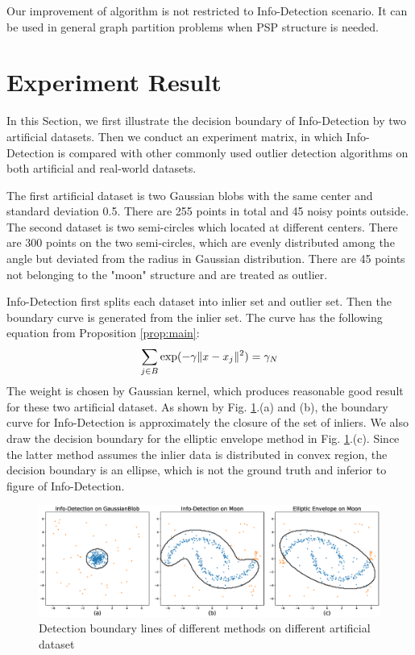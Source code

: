 \documentclass[runningheads]{llncs}
\begin{document}
Our improvement of algorithm is not restricted to Info-Detection scenario. It can be used in general graph partition problems when PSP structure is needed.

\section{Experiment Result}\label{sec:Experiemt}
In this Section, we first illustrate the decision boundary of Info-Detection by two artificial datasets. Then we conduct an experiment matrix, in which Info-Detection is compared with other commonly used outlier detection algorithms on both artificial and real-world datasets.

The first artificial dataset is two Gaussian blobs with the same center and standard deviation 0.5. There are 255 points in total and 45 noisy points outside.
The second dataset is two semi-circles which located at different centers. There are 300 points on the two semi-circles, which are evenly distributed among the angle but deviated from the radius in Gaussian distribution. There are 45 points not belonging to the "moon" structure and are treated as outlier.

Info-Detection first splits each dataset into inlier set and outlier set. Then the boundary curve is generated from the inlier set. The curve has the following equation from Proposition \ref{prop:main}:
\begin{equation}
\sum_{j \in B} \exp(-\gamma \lVert x - x_j\rVert^2)= \gamma_N
\end{equation}
The weight is chosen by Gaussian kernel, which produces reasonable good result for these two artificial dataset. As shown by Fig. \ref{fig:boundary}.(a) and (b), the boundary curve for Info-Detection is approximately the closure of the set of inliers. We also draw the decision boundary for the elliptic envelope method in Fig. \ref{fig:boundary}.(c). Since the latter method assumes the inlier data is distributed in convex region, the decision boundary is an ellipse, which is not the ground truth and inferior to figure of Info-Detection.
\begin{figure}[!ht]
	\centering
	\includegraphics[width=\textwidth]{pic/outlier_boundary_illustration.eps}
	\caption{Detection boundary lines of different methods on different artificial dataset}	\label{fig:boundary}
\end{figure}
\end{document}
